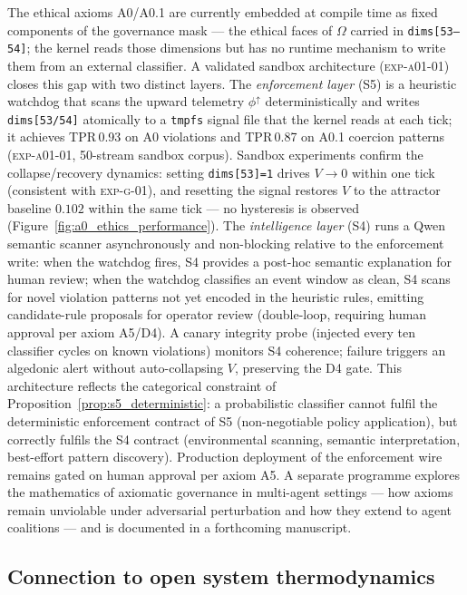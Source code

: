 \documentclass[11pt, a4paper]{article}
\begin{document}
The ethical axioms A0/A0.1 are currently embedded at compile time as
fixed components of the governance mask --- the ethical faces of $\Omega$
carried in \texttt{dims[53--54]}; the kernel reads those dimensions but has
no runtime mechanism to write them from an external classifier.
A validated sandbox architecture (\textsc{exp-a01-01}) closes this gap
with two distinct layers.
The \emph{enforcement layer} (S5) is a heuristic watchdog that scans the
upward telemetry $\phi^\uparrow$ deterministically and writes
\texttt{dims[53/54]} atomically to a \texttt{tmpfs} signal file that the
kernel reads at each tick; it achieves TPR\,0.93 on A0 violations and
TPR\,0.87 on A0.1 coercion patterns (\textsc{exp-a01-01}, 50-stream
sandbox corpus).
Sandbox experiments confirm the collapse/recovery dynamics: setting
\texttt{dims[53]=1} drives $V\to 0$ within one tick (consistent with
\textsc{exp-g-01}), and resetting the signal restores $V$ to the
attractor baseline $0.102$ within the same tick --- no hysteresis is
observed (Figure~\ref{fig:a0_ethics_performance}).
The \emph{intelligence layer} (S4) runs a Qwen semantic scanner
asynchronously and non-blocking relative to the enforcement write:
when the watchdog fires, S4 provides a post-hoc semantic explanation
for human review; when the watchdog classifies an event window as clean,
S4 scans for novel violation patterns not yet encoded in the heuristic
rules, emitting candidate-rule proposals for operator review (double-loop,
requiring human approval per axiom A5/D4).
A canary integrity probe (injected every ten classifier cycles on known
violations) monitors S4 coherence; failure triggers an algedonic alert
without auto-collapsing $V$, preserving the D4 gate.
This architecture reflects the categorical constraint of
Proposition~\ref{prop:s5_deterministic}: a probabilistic classifier cannot
fulfil the deterministic enforcement contract of S5 (non-negotiable policy
application), but correctly fulfils the S4 contract (environmental scanning,
semantic interpretation, best-effort pattern discovery).
Production deployment of the enforcement wire remains gated on human
approval per axiom A5.
A separate programme explores the mathematics of axiomatic governance
in multi-agent settings --- how axioms remain unviolable under
adversarial perturbation and how they extend to agent coalitions ---
and is documented in a forthcoming manuscript.

\subsection*{Connection to open system thermodynamics}
\end{document}
